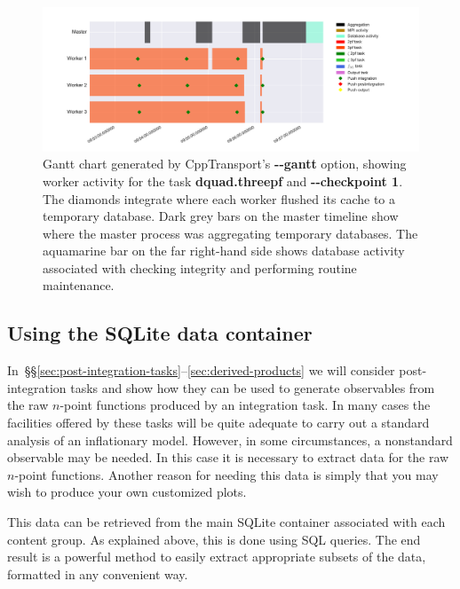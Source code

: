 \documentclass[11pt,a4paper]{article}
\renewcommand{\texttt}[1]{{\ttfamily\fontseries{l}\selectfont{#1}}}
\newcommand{\repoobject}[1]{{\ttfamily\bfseries\small #1}}
\newcommand{\packagefont}{\sffamily}
\newcommand{\CppTransport}{{\packagefont CppTransport}}
\newcommand{\SQLite}{{\packagefont SQLite}}
\newcommand{\file}[1]{\texttt{{#1}}}
\newcommand{\option}[1]{{\ttfamily\bfseries\small #1}}
\begin{document}
\begin{figure}
    \begin{center}
        \includegraphics[scale=0.5]{Outputs/gantt}    
    \end{center}
    \caption{\label{fig:gantt}Gantt chart
    generated by {\CppTransport}'s \option{{-}{-}gantt} option,
    showing worker activity
    for the task \repoobject{dquad.threepf}
    and \option{{-}{-}checkpoint 1}.
    The diamonds integrate where each worker flushed its cache
    to a temporary database.
    Dark grey bars on the master timeline show where the
    master process was aggregating temporary databases.
    The aquamarine bar on the far right-hand side
    shows database activity associated
    with checking integrity and performing routine maintenance.}
\end{figure}

\subsection{Using the {\SQLite} data container}
\label{sec:using-integration-container}
In~\S\S\ref{sec:post-integration-tasks}--\ref{sec:derived-products}
we will consider post-integration tasks and show how they can be used
to generate observables from the raw $n$-point functions produced by
an integration task.
In many cases the facilities offered by these
tasks will be quite adequate to carry out a
standard analysis of an inflationary model.
However, in some circumstances, a nonstandard observable may be
needed.
In this case it is necessary to extract data for the raw $n$-point functions.
Another reason for needing this data is simply that you may
wish to produce your own customized plots.

This data can be retrieved from the main {\SQLite} container
\file{data.sqlite}
associated with each content group.
As explained above, this is done using SQL queries.
The end result is a powerful method to easily extract appropriate subsets
of the data, formatted in any convenient way.
\end{document}
